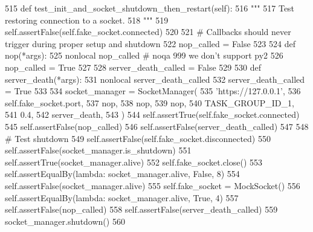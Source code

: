 \begin{DoxyCode}
515     \textcolor{keyword}{def }test\_init\_and\_socket\_shutdown\_then\_restart(self):
516         \textcolor{stringliteral}{"""}
517 \textcolor{stringliteral}{        Test restoring connection to a socket.}
518 \textcolor{stringliteral}{        """}
519         self.assertFalse(self.fake\_socket.connected)
520 
521         \textcolor{comment}{# Callbacks should never trigger during proper setup and shutdown}
522         nop\_called = \textcolor{keyword}{False}
523 
524         \textcolor{keyword}{def }nop(*args):
525             nonlocal nop\_called  \textcolor{comment}{# noqa 999 we don't support py2}
526             nop\_called = \textcolor{keyword}{True}
527 
528         server\_death\_called = \textcolor{keyword}{False}
529 
530         \textcolor{keyword}{def }server\_death(*args):
531             nonlocal server\_death\_called
532             server\_death\_called = \textcolor{keyword}{True}
533 
534         socket\_manager = SocketManager(
535             \textcolor{stringliteral}{'https://127.0.0.1'},
536             self.fake\_socket.port,
537             nop,
538             nop,
539             nop,
540             TASK\_GROUP\_ID\_1,
541             0.4,
542             server\_death,
543         )
544         self.assertTrue(self.fake\_socket.connected)
545         self.assertFalse(nop\_called)
546         self.assertFalse(server\_death\_called)
547 
548         \textcolor{comment}{# Test shutdown}
549         self.assertFalse(self.fake\_socket.disconnected)
550         self.assertFalse(socket\_manager.is\_shutdown)
551         self.assertTrue(socket\_manager.alive)
552         self.fake\_socket.close()
553         self.assertEqualBy(\textcolor{keyword}{lambda}: socket\_manager.alive, \textcolor{keyword}{False}, 8)
554         self.assertFalse(socket\_manager.alive)
555         self.fake\_socket = MockSocket()
556         self.assertEqualBy(\textcolor{keyword}{lambda}: socket\_manager.alive, \textcolor{keyword}{True}, 4)
557         self.assertFalse(nop\_called)
558         self.assertFalse(server\_death\_called)
559         socket\_manager.shutdown()
560 
\end{DoxyCode}
\mbox{\label{classparlai_1_1mturk_1_1core_1_1dev_1_1test_1_1test__socket__manager_1_1TestSocketManagerSetupAndFunctions_a3d9a3b7b099516e150f51b5ecb8b0af3}} 
